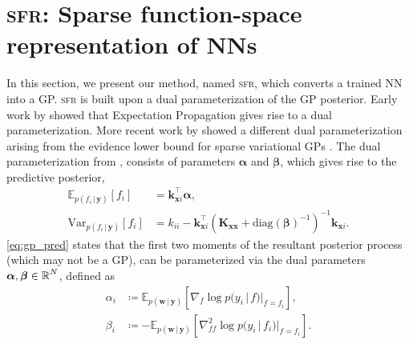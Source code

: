 \documentclass{article}
\renewcommand{\paragraph}[1]{{\bf #1}~~}
\newcommand{\our}{\textsc{sfr}\xspace}
\newcommand{\mathbold}[1]{\bm{#1}}
\newcommand{\mbf}[1]{\mathbf{#1}}
\renewcommand{\mid}{\,|\,}
\newcommand{\valpha}[0]{\mathbold{\alpha}}
\newcommand{\vbeta}[0]{\mathbold{\beta}}
\newcommand{\diag}{\text{{diag}}}
\newcommand{\vx}{\mbf{x}}
\newcommand{\vy}{\mbf{y}}
\newcommand{\vw}{\mbf{w}}
\newcommand{\MKxx}{\mbf{K}_{\mbf{x}\mbf{x}}}
\newcommand{\vk}{\mbf{k}}
\newcommand{\myexpect}{\mathbb{E}}
\begin{document}
\section{\our: Sparse function-space representation of NNs}\label{sec:sfr}
In this section, we present our method, named \our, which converts a trained NN into a GP.
\our is built upon a dual parameterization of the GP posterior.
Early work by \citet{csato2002sparse} showed that Expectation Propagation gives rise to a dual parameterization.
More recent work by \citet{adam2021dual,chang2023memory} showed a different dual parameterization arising from the evidence lower bound for sparse variational GPs \citep{hensman2013gaussian,titsias2009variational}.
The dual parameterization from \citet{adam2021dual,chang2023memory}, consists of parameters $\valpha$ and $\vbeta$, which gives rise to the predictive posterior,
\begin{subequations}  \label{eq:gp_pred}
\begin{align}
  \myexpect_{p(f_i \mid\vy)}[f_i] &= \vk_{\vx i}^\top \valpha, \\
  \mathrm{Var}_{p(f_i \mid \vy)}[f_i] &= k_{ii} - \vk_{\vx i}^\top ( \MKxx + \diag(\vbeta)^{-1})^{-1} \vk_{\vx i}.  \nonumber
\end{align}
\end{subequations}
%
\cref{eq:gp_pred} states that the first two moments of the resultant posterior process (which may not be a GP), can be parameterized via the dual
parameters $\valpha, \vbeta \in \R^{N}$,
defined as 
%
\begin{subequations}
\label{eq:dual_param}
\begin{align}
  \alpha_i &\coloneqq \myexpect_{p(\vw \mid \vy)}[\nabla_{f}\log p(y_i \mid f) |_{f=f_i}], \\
  \beta_i &\coloneqq - \myexpect_{p(\vw \mid \vy)}[\nabla^2_{f f}\log p(y_i \mid f_i) |_{f=f_i}].
  \end{align}
\end{subequations}
\end{document}
